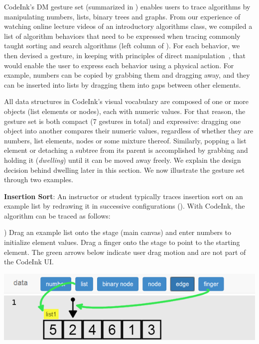 CodeInk's DM gesture set (summarized in ) enables
users to trace algorithms by manipulating numbers, lists, binary trees and
graphs. From our experience of watching online lecture videos of an introductory
algorithms class, we compiled a list of algorithm behaviors that need to be
expressed when tracing commonly taught sorting and search algorithms (left
column of ).
For each behavior, we then devised a gesture, in keeping with principles of direct
manipulation~\cite{Shneiderman1982, Lee2012}, that would enable the user to
express each behavior using a physical action. For example, numbers can be
copied by grabbing them and dragging away, and they can be inserted into lists
by dragging them into gaps between other elements.

All data structures in CodeInk's visual vocabulary are composed of one
or more objects (list elements or nodes), each with numeric values. For
that reason, the gesture set is both compact (7 gestures in total) and
expressive: dragging one object into another compares their numeric
values, regardless of whether they are numbers, list elements, nodes or
some mixture thereof. Similarly, popping a list element or detaching a
subtree from its parent is accomplished by grabbing and holding it
(\emph{dwelling}) until it can be moved away freely. We explain the
design decision behind dwelling later in this section. We now illustrate
the gesture set through two examples.

\noindent \textbf{Insertion Sort}: An instructor or student typically
traces insertion sort on an example list by redrawing it in successive
configurations (). With CodeInk, the algorithm
can be traced as follows:

) Drag an example list onto the stage (main canvas) and enter
numbers to initialize element values. Drag a finger onto the stage to
point to the starting element. The green arrows below indicate user drag
motion and are not part of the CodeInk UI.

\vspace{-0.25em}
\noindent \includegraphics[width=0.7\columnwidth]{img/examples/insertion-1.png}
\vspace{0.5em}

